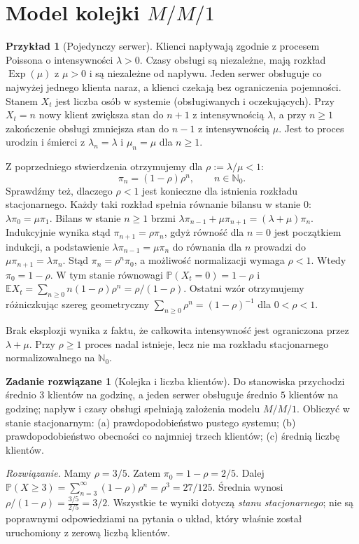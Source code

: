 \documentclass[11pt,a4paper,oneside]{report}
\numberwithin{equation}{chapter}
\theoremstyle{plain}
\theoremstyle{definition}
\newtheorem{przyklad}{Przykład}[chapter]
\newtheorem{zadanie}{Zadanie rozwiązane}[chapter]
\theoremstyle{remark}
\newcommand{\N}{\mathbb{N}}
\newcommand{\Prob}{\mathbb{P}}
\newcommand{\E}{\mathbb{E}}
\begin{document}
\section{Model kolejki \texorpdfstring{$M/M/1$}{M/M/1}}
\begin{przyklad}[Pojedynczy serwer]
Klienci napływają zgodnie z procesem Poissona o intensywności
$\lambda>0$. Czasy obsługi są niezależne, mają rozkład
$\operatorname{Exp}(\mu)$ z $\mu>0$ i są niezależne
od napływu. Jeden serwer obsługuje co najwyżej jednego klienta
naraz, a klienci czekają bez ograniczenia pojemności.
Stanem $X_t$ jest liczba osób w systemie (obsługiwanych
i oczekujących). Przy $X_t=n$ nowy klient zwiększa stan do
$n+1$ z intensywnością $\lambda$, a przy $n\ge1$
zakończenie obsługi zmniejsza stan do $n-1$ z intensywnością
$\mu$. Jest to proces urodzin i śmierci z
$\lambda_n=\lambda$ i $\mu_n=\mu$ dla $n\ge1$.

Z poprzedniego stwierdzenia otrzymujemy dla
$\rho:=\lambda/\mu<1$:
\[
\pi_n=(1-\rho)\rho^n,\qquad n\in\N_0.
\]
Sprawdźmy też, dlaczego $\rho<1$ jest konieczne dla
istnienia rozkładu stacjonarnego. Każdy taki rozkład
spełnia równanie bilansu w stanie $0$:
$\lambda\pi_0=\mu\pi_1$.
Bilans w stanie $n\ge1$ brzmi
$\lambda\pi_{n-1}+\mu\pi_{n+1}=(\lambda+\mu)\pi_n$.
Indukcyjnie wynika stąd $\pi_{n+1}=\rho\pi_n$, gdyż
równość dla $n=0$ jest początkiem indukcji, a podstawienie
$\lambda\pi_{n-1}=\mu\pi_n$ do równania dla $n$
prowadzi do $\mu\pi_{n+1}=\lambda\pi_n$.
Stąd $\pi_n=\rho^n\pi_0$, a możliwość normalizacji wymaga
$\rho<1$. Wtedy $\pi_0=1-\rho$.
W tym stanie równowagi
$\Prob(X_t=0)=1-\rho$ i
$\E X_t=\sum_{n\ge0}n(1-\rho)\rho^n=\rho/(1-\rho)$.
Ostatni wzór otrzymujemy różniczkując szereg geometryczny
$\sum_{n\ge0}\rho^n=(1-\rho)^{-1}$ dla $0<\rho<1$.

Brak eksplozji wynika z faktu, że całkowita intensywność
jest ograniczona przez $\lambda+\mu$. Przy $\rho\ge1$
proces nadal istnieje, lecz nie ma rozkładu stacjonarnego
normalizowalnego na $\N_0$.
\end{przyklad}

\begin{zadanie}[Kolejka i liczba klientów]
Do stanowiska przychodzi średnio $3$ klientów na godzinę,
a jeden serwer obsługuje średnio $5$ klientów na godzinę;
napływ i czasy obsługi spełniają założenia modelu $M/M/1$.
Obliczyć w stanie stacjonarnym: (a) prawdopodobieństwo
pustego systemu; (b) prawdopodobieństwo obecności co
najmniej trzech klientów; (c) średnią liczbę klientów.

\emph{Rozwiązanie.} Mamy $\rho=3/5$. Zatem
$\pi_0=1-\rho=2/5$.
Dalej
$\Prob(X\ge3)=\sum_{n=3}^\infty(1-\rho)\rho^n
=\rho^3=27/125$.
Średnia wynosi $\rho/(1-\rho)=\frac{3/5}{2/5}=3/2$.
Wszystkie te wyniki dotyczą \emph{stanu stacjonarnego};
nie są poprawnymi odpowiedziami na pytania o układ,
który właśnie został uruchomiony z zerową liczbą klientów.
\end{zadanie}
\end{document}
